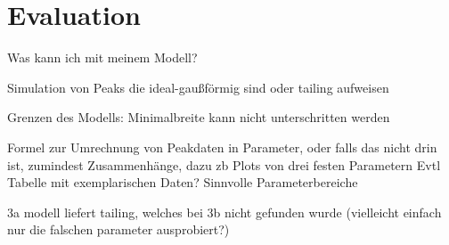 
\chapter{Evaluation}
\label{chapter:eva}

Was kann ich mit meinem Modell?

Simulation von Peaks die ideal-gaußförmig sind oder tailing aufweisen

Grenzen des Modells:
Minimalbreite kann nicht unterschritten werden


Formel zur Umrechnung von Peakdaten in Parameter, oder falls das nicht drin ist, zumindest Zusammenhänge, dazu zb Plots von drei festen Parametern
Evtl Tabelle mit exemplarischen Daten?
Sinnvolle Parameterbereiche

3a modell liefert tailing, welches bei 3b nicht gefunden wurde (vielleicht einfach nur die falschen parameter ausprobiert?)

